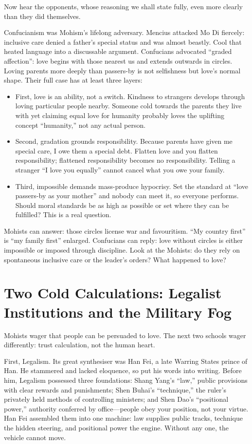 Now hear the opponents, whose reasoning we shall state fully, even more clearly than they did themselves.

Confucianism was Mohism's lifelong adversary. Mencius attacked Mo Di fiercely: inclusive care denied a father's special status and was almost beastly. Cool that heated language into a discussable argument. Confucians advocated ``graded affection'': love begins with those nearest us and extends outwards in circles. Loving parents more deeply than passers-by is not selfishness but love's normal shape. Their full case has at least three layers:

\begin{itemize}
\item First, love is an ability, not a switch. Kindness to strangers develops through loving particular people nearby. Someone cold towards the parents they live with yet claiming equal love for humanity probably loves the uplifting concept ``humanity,'' not any actual person.
\item Second, gradation grounds responsibility. Because parents have given me special care, I owe them a special debt. Flatten love and you flatten responsibility; flattened responsibility becomes no responsibility. Telling a stranger ``I love you equally'' cannot cancel what you owe your family.
\item Third, impossible demands mass-produce hypocrisy. Set the standard at ``love passers-by as your mother'' and nobody can meet it, so everyone performs. Should moral standards be as high as possible or set where they can be fulfilled? This is a real question.
\end{itemize}
Mohists can answer: those circles license war and favouritism. ``My country first'' is ``my family first'' enlarged. Confucians can reply: love without circles is either impossible or imposed through discipline. Look at the Mohists: do they rely on spontaneous inclusive care or the leader's orders? What happened to love?

\section[Institutions and the Fog of War]{Two Cold Calculations: Legalist Institutions and the Military Fog}
Mohists wager that people can be persuaded to love. The next two schools wager differently: trust calculation, not the human heart.

First, Legalism. Its great synthesiser was Han Fei, a late Warring States prince of Han. He stammered and lacked eloquence, so put his words into writing. Before him, Legalism possessed three foundations: Shang Yang's ``law,'' public provisions with clear rewards and punishments; Shen Buhai's ``technique,'' the ruler's privately held methods of controlling ministers; and Shen Dao's ``positional power,'' authority conferred by office---people obey your position, not your virtue. Han Fei assembled them into one machine: law supplies public tracks, technique the hidden steering, and positional power the engine. Without any one, the vehicle cannot move.


